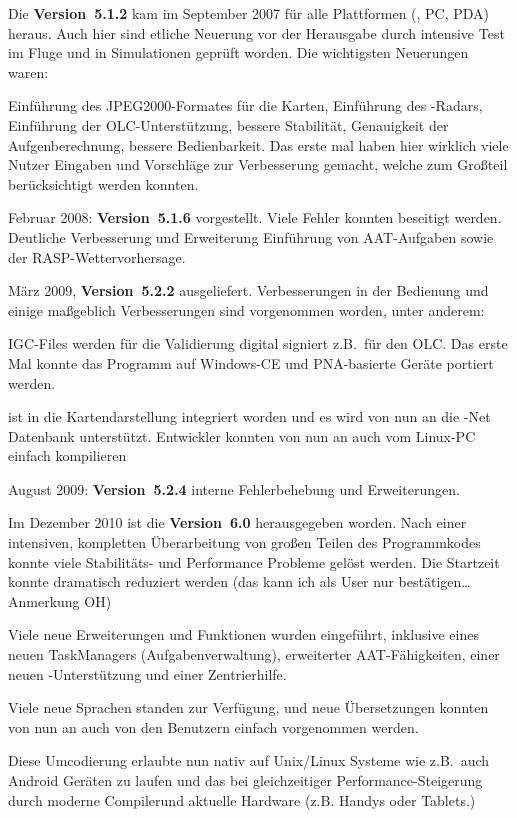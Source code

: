 Die {\bf Version~5.1.2} kam im September 2007 für alle Plattformen (\xc, PC, PDA) heraus.
Auch hier sind etliche Neuerung vor der Herausgabe  durch intensive Test im Fluge und in Simulationen geprüft worden.
Die wichtigsten Neuerungen waren:

Einführung des JPEG2000-Formates für die Karten, Einführung des \fl-Radars, Einführung der
OLC-Unterstützung, bessere Stabilität, Genauigkeit der Aufgenberechnung, bessere Bedienbarkeit.
Das erste mal haben hier wirklich viele Nutzer Eingaben und Vorschläge zur Verbesserung gemacht,
welche  zum Großteil berücksichtigt werden konnten.

Februar 2008:  {\bf Version~5.1.6} vorgestellt. Viele Fehler konnten beseitigt werden. Deutliche Verbesserung und
Erweiterung Einführung von AAT-Aufgaben sowie der RASP-Wettervorhersage.

März 2009, {\bf Version~5.2.2} ausgeliefert. Verbesserungen in der Bedienung und einige maßgeblich Verbesserungen sind
vorgenommen worden, unter anderem:

IGC-Files werden für die Validierung digital signiert z.B.\ für den OLC. Das erste Mal konnte das Programm auf Windows-CE
und PNA-basierte Geräte portiert werden.

\fl ist in die Kartendarstellung integriert worden und es wird von nun an die \fl-Net Datenbank unterstützt.
Entwickler konnten von nun an \xc auch vom Linux-PC einfach kompilieren

August  2009: {\bf Version~5.2.4} interne Fehlerbehebung und Erweiterungen.

Im Dezember 2010 ist die {\bf Version~6.0} herausgegeben worden.
Nach einer intensiven, kompletten  Überarbeitung von großen Teilen des Programmkodes konnte viele Stabilitäts- und Performance
Probleme gelöst werden. Die Startzeit konnte dramatisch reduziert werden {(\small das kann ich als User nur bestätigen\dots Anmerkung OH)}

Viele neue Erweiterungen und Funktionen wurden eingeführt, inklusive eines neuen TaskManagers (Aufgabenverwaltung),
erweiterter AAT-Fähigkeiten, einer neuen \fl-Unterstützung und einer Zentrierhilfe.

Viele neue Sprachen standen zur Verfügung, und neue Übersetzungen konnten von nun an auch von
den Benutzern einfach vorgenommen werden.

Diese Umcodierung erlaubte \xc nun nativ auf Unix/Linux Systeme wie z.B.\ auch Android Geräten zu laufen
und das bei gleichzeitiger Performance-Steigerung durch moderne Compilerund aktuelle Hardware (z.B. Handys oder Tablets.)

